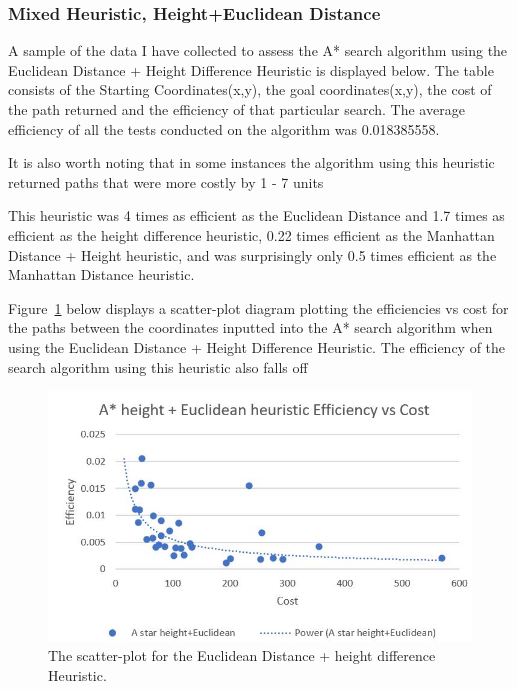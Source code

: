 \documentclass[11pt,oneside]{article}
\begin{document}
\subsubsection{Mixed Heuristic, Height+Euclidean Distance}
A sample of the data I have collected to assess the A* search algorithm using the Euclidean Distance + Height Difference Heuristic is displayed below. The table consists of the Starting Coordinates(x,y), the goal coordinates(x,y), the cost of the path returned and the efficiency of that particular search. The average efficiency of all the tests conducted on the algorithm was 0.018385558.

It is also worth noting that in some instances the algorithm using this heuristic returned paths that were more costly by 1 - 7 units 

This heuristic was 4 times as efficient as the Euclidean Distance and 1.7 times as efficient as the height difference heuristic, 0.22 times efficient as the Manhattan Distance + Height heuristic, and was surprisingly only 0.5 times efficient as the Manhattan Distance heuristic.

Figure~\ref{fig:EDHDEvC} below displays a scatter-plot diagram plotting the efficiencies vs cost for the paths between the coordinates inputted into the A* search algorithm when using the Euclidean Distance + Height Difference Heuristic. The efficiency of the search algorithm using this heuristic also falls off 
\begin{figure}[H]
    \centering
      \includegraphics[scale=0.8]{ED+HD efficiency vs cost.JPG}
      \caption{The scatter-plot for the Euclidean Distance + height difference Heuristic.}
      \label{fig:EDHDEvC}
    \end{figure} 
    
\end{document}
